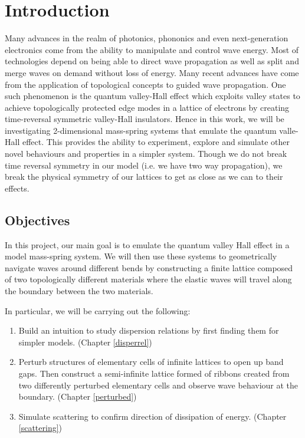 \chapter{Introduction}
Many advances in the realm of photonics, phononics and even next-generation
electronics come from the ability to manipulate and control wave
energy.\cite{gravwaves,emcloak,diremi,antennasol,THz,absorbing,toposplit,negrefraclens}
Most of technologies depend on being able to direct wave propagation as well as
split and merge waves on demand without loss of energy. Many recent advances
have come from the application of topological concepts to guided wave
propagation.\cite{singlevalley,qshe,valleyhall,2dtopophoto} One such phenomenon
is the quantum valley-Hall effect which exploits valley states to achieve
topologically protected edge modes in a lattice of electrons by creating
time-reversal symmetric valley-Hall
insulators.\cite{allsitopo,dielectopo,sonicvalley} Hence in this work, we will
be investigating 2-dimensional mass-spring systems that emulate the quantum
valle-Hall effect. This provides the ability to experiment, explore and
simulate other novel behaviours and properties in a simpler system. Though we
do not break time reversal symmetry in our model (i.e. we have two way
propagation), we break the physical symmetry of our lattices to get as close as
we can to their effects.

\section{Objectives}
In this project, our main goal is to emulate the quantum valley Hall
effect\cite{mos2, valleyhall} in a model mass-spring system. We will then use
these systems to geometrically navigate waves around different bends by
constructing a finite lattice composed of two topologically different materials
where the elastic waves will travel along the boundary between the two
materials.

In particular, we will be carrying out the following:

\begin{enumerate}
\item Build an intuition to study dispersion relations by first finding them
      for simpler models. (Chapter \ref{disperrel})
\item Perturb structures of elementary cells of infinite lattices to open up
      band gaps. Then construct a semi-infinite lattice formed of ribbons
      created from two differently perturbed elementary cells and observe wave
      behaviour at the boundary. (Chapter \ref{perturbed})
\item Simulate scattering to confirm direction of dissipation of energy.
      (Chapter \ref{scattering})
\end{enumerate}

